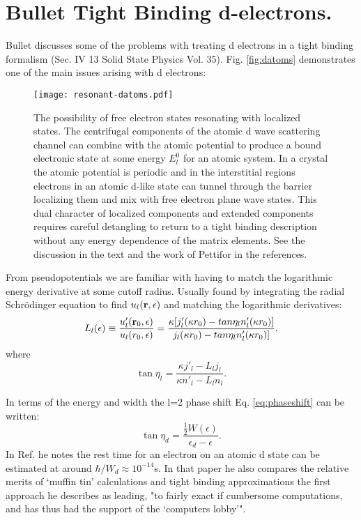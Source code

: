 \documentclass{article}
\def\r{{\bf r}}
\begin{document}
\section{Bullet Tight Binding d-electrons.}
Bullet discusses some of the problems with treating d electrons in a tight binding 
formalism (Sec. IV 13 Solid State Physics Vol. 35). Fig. \ref{fig:datoms} demonstrates
one of the main issues arising with d electrons:
\begin{figure}
\texttt{[image: resonant-datoms.pdf]}
\caption{The possibility of free electron states resonating with localized states.
The centrifugal components of the atomic d wave scattering channel can combine with
the atomic potential to produce a bound electronic state at some energy $E^{0}_{l}$ for an atomic system.
In a crystal the atomic potential is periodic and in the interstitial regions electrons in an 
atomic d-like state can tunnel through the barrier localizing them and mix with free electron 
plane wave states. This dual character of localized components and extended components requires careful 
detangling to return to a tight binding description without any energy dependence 
of the matrix elements. See the discussion in the text and the work
of Pettifor in the references.}
\end{figure}

From pseudopotentials we are familiar with having to match the logarithmic energy
derivative at some cutoff radius. Usually found by integrating the radial
Schr\"odinger equation to find $u_{l}(\r,\epsilon)$ and matching the logarithmic derivatives:
%
\begin{equation}
L_{l}(\epsilon) \equiv \frac{u'_{l}(\r_{0},\epsilon)}{u_{l}(r_{0},\epsilon)} = \frac{\kappa[j'_{l}
(\kappa r_{0}) - tan \eta_{l} n'_{l}(\kappa r_{0})]} {j_{l}(\kappa r_{0}) - tan \eta_{l} n_{l}'(\kappa r_{0})]},
\end{equation}
%
where
\begin{equation}
\label{eq:phaseshift}
\tan \eta_{l} = \frac{\kappa j'_{l} - L_{l}j_{l}}{\kappa n'_{l} - L_{l}n_{l}}.
\end{equation}

In terms of the energy and width the l=2 phase shift Eq. \ref{eq:phaseshift} 
can be written:
%
\begin{equation}
\label{eq:dshift}
\tan \eta_{d} = \frac{\frac{1}{2}W(\epsilon)}{\epsilon_{d}-\epsilon}.
\end{equation}
%
In Ref. \cite{friedel73} he notes the rest time for an electron on an atomic d state 
can be estimated at around $\hbar/W_{d}\approx 10^{-14}$s. In that paper he also
compares the relative merits of `muffin tin' calculations and tight binding approximations
the first approach he describes as leading, "to fairly exact if cumbersome
computations, and has thus had the support of the `computers lobby'".
\end{document}
